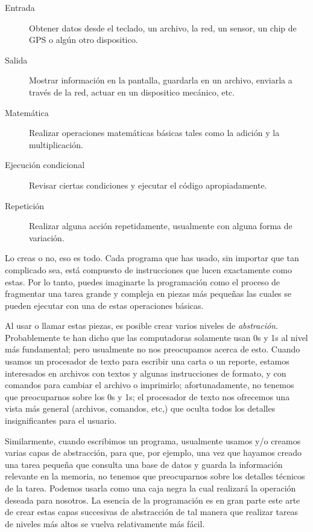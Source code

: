 \begin{description}

\item[Entrada] Obtener datos desde el teclado, un archivo, la red, 
un sensor, un chip de GPS o algún otro dispositico.

\item[Salida] Mostrar información en la pantalla, guardarla en un archivo,
 enviarla a través de la red, actuar en un dispositico mecánico,  etc.

\item[Matemática] Realizar operaciones matemáticas básicas tales como la adición y
la multiplicación.

\item[Ejecución condicional] Revisar ciertas condiciones y ejecutar el código 
apropiadamente.

\item[Repetición] Realizar alguna acción repetidamente, usualmente con alguna
forma de variación.

\end{description}

Lo creas o no, eso es todo. Cada programa que has usado, sin importar
que tan complicado sea, está compuesto de instrucciones que lucen exactamente
como estas. Por lo tanto, puedes imaginarte la programación como el 
proceso de fragmentar una tarea grande y compleja en piezas más pequeñas
las cuales se pueden ejecutar con una de estas operaciones básicas.

Al usar o llamar estas piezas, es posible crear varios niveles
de \emph{abstración}. Probablemente te han dicho que las computadoras
solamente usan 0s y 1s al nivel más fundamental; pero usualmente no 
nos preocupamos acerca de esto. Cuando usamos un procesador de texto para
escribir una carta o un reporte, estamos interesados en archivos con textos
y algunas instrucciones de formato, y con comandos para cambiar el archivo o
imprimirlo; afortunadamente, no tenemos que preocuparnos sobre los 0s y 1s; el
procesador de texto nos ofrecemos una vista más general (archivos, comandos, etc,)
que oculta todos los detalles insignificantes para el usuario. 


Similarmente, cuando escribimos un programa, 
usualmente usamos y/o creamos varias capas de abstracción, 
para que, por ejemplo, una vez que hayamos creado una tarea pequeña 
que consulta una base de datos y guarda la información relevante
en la memoria, no tenemos que preocuparnos sobre los detalles técnicos
de la tarea. Podemos usarla como una caja negra la cual realizará 
la operación deseada para nosotros. La esencia de la programación es 
en gran parte este arte de crear estas capas succesivas de abstracción 
de tal manera que realizar tareas de niveles más altos se vuelva 
relativamente más fácil.


